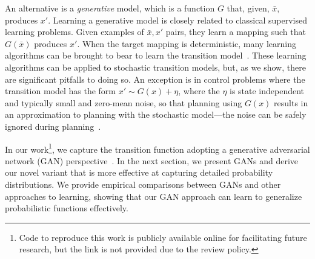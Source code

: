 \documentclass[letterpaper]{article} %
\begin{document}
An alternative is a \emph{generative} model, which is a function $G$ that, given, $\bar{x}$, produces $x'$.
%
%
Learning a generative model is closely related to classical supervised learning problems. Given examples of $\bar{x},x'$ pairs, they learn a mapping such that $G(\bar{x})$ produces $x'$. When the target mapping is deterministic, many learning algorithms can be brought to bear to learn the transition model~\cite{atkeson97b}.
These learning algorithms can be applied to stochastic transition models, but, as we show, there are significant pitfalls to doing so. An exception is in control problems where the transition model has the form $x' \sim G(x) + \eta$, where the $\eta$ is state independent and typically small and zero-mean noise, so that planning using $G(x)$ results in an approximation to planning with the stochastic model---the noise can be safely ignored during planning~\cite{Bradtke93}.

In our work\footnote{Code to reproduce this work is publicly available online for facilitating future research, but the link is not provided due to the review policy.}, we capture the transition function adopting a generative adversarial network (GAN) perspective~\cite{goodfellow2014generative}. In the next section, we present GANs and derive our novel variant that is more effective at capturing detailed probability distributions. We provide empirical comparisons between GANs and other approaches to learning, showing that our GAN approach can learn to generalize probabilistic functions effectively.
\end{document}
